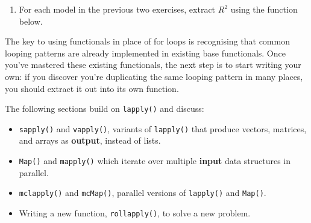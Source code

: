 \begin{enumerate}
\begin{Shaded}
\begin{Highlighting}[]
\StringTok{ }\NormalTok{(}\NormalTok{:}
  \StringTok{ }\NormalTok{(}\NormalTok{:} \NormalTok{)}
\NormalTok{\})}
\end{Highlighting}
\end{Shaded}
\item
  For each model in the previous two exercises, extract \(R^2\) using
  the function below.

\begin{Shaded}
\begin{Highlighting}[]
\StringTok{ }
\end{Highlighting}
\end{Shaded}
\end{enumerate}


The key to using functionals in place of for loops is recognising that
common looping patterns are already implemented in existing base
functionals. Once you've mastered these existing functionals, the next
step is to start writing your own: if you discover you're duplicating
the same looping pattern in many places, you should extract it out into
its own function.

The following sections build on \texttt{lapply()} and discuss:

\begin{itemize}
\item
  \texttt{sapply()} and \texttt{vapply()}, variants of \texttt{lapply()}
  that produce vectors, matrices, and arrays as \textbf{output}, instead
  of lists.
\item
  \texttt{Map()} and \texttt{mapply()} which iterate over multiple
  \textbf{input} data structures in parallel.
\item
  \texttt{mclapply()} and \texttt{mcMap()}, parallel versions of
  \texttt{lapply()} and \texttt{Map()}.
\item
  Writing a new function, \texttt{rollapply()}, to solve a new problem.
\end{itemize}

